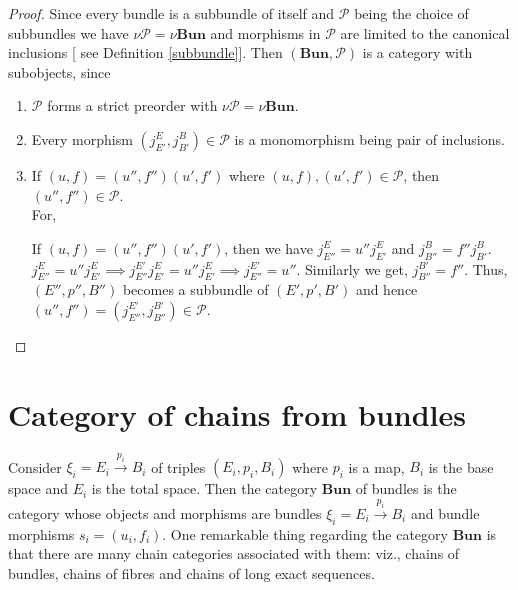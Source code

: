 \documentclass[10pt,a4paper]{amsart}
\begin{document}
\begin{proof} Since every bundle is a subbundle of itself and $\mathcal {P}$ being the choice of subbundles we have $\nu \mathcal {P} = \nu \textbf{Bun}$ and morphisms in $\mathcal {P}$  are limited to the canonical inclusions [ see Definition \ref{subbundle}].
	 Then $(\textbf{Bun},\mathcal {P} )$ is a category with subobjects, since 
	\begin{enumerate}
		\item $\mathcal {P}$ forms a strict preorder with $\nu \mathcal {P} = \nu \textbf{Bun}$.
		\item Every morphism  $(j_{E'}^{E}, j_{B'}^{B}) \in \mathcal {P}$ is a monomorphism being pair of inclusions.
		\item If $ (u, f) = (u'', f'')(u', f') $ where $ (u, f), (u', f') \in  \mathcal {P}$, then $(u'', f'') \in  \mathcal {P}$.\\
		    For, 
		    \begin{center}
		    \end{center}
	    \begin{center}
	    \end{center}
    If $ (u, f) = (u'', f'')(u', f') $, then we have $j_{E''}^{E} = u''j_{E'}^{E}$ and $j_{B''}^{B} = f'' j_{B'}^{B}$.\\
    $j_{E''}^{E} = u''j_{E'}^{E} \implies j_{E''}^{E'}j_{E'}^{E} = u''j_{E'}^{E} \implies j_{E''}^{E'} = u''$. Similarly we get, $ j_{B''}^{B'} = f''$. Thus, $(E'',p'',B'')$ becomes a  subbundle of $(E', p', B')$ and hence $(u'', f'') = (j_{E''}^{E'},j_{B''}^{B'} ) \in \mathcal {P}$.
	\end{enumerate}
\end{proof}

\section{Category of chains from bundles}
Consider $\xi_i = E_i \stackrel{p_i}{\rightarrow}  B_i$ of triples $(E_i, p_i, B_i)$ where $p_i$ is a map, $B_i$ is the base space and $E_i$ is the total space. Then the category $\textbf{Bun} $ of bundles is the category whose objects and morphisms are bundles $\xi_i = E_i \stackrel{p_i}{\rightarrow}  B_i$ and bundle morphisms $s_i = (u_i, f_i)$. One remarkable thing regarding the category $\textbf{Bun} $ is that there are many chain  categories associated with them: viz., chains of bundles, chains of fibres and chains of long exact sequences. 
\end{document}
